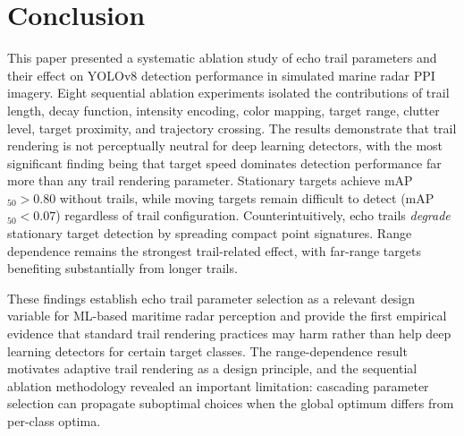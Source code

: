 \documentclass[colorlinks,upint,balance]{asmeconf}
\begin{document}
\section{Conclusion}

This paper presented a systematic ablation study of echo trail parameters and their effect on YOLOv8 detection performance in simulated marine radar PPI imagery. Eight sequential ablation experiments isolated the contributions of trail length, decay function, intensity encoding, color mapping, target range, clutter level, target proximity, and trajectory crossing. The results demonstrate that trail rendering is not perceptually neutral for deep learning detectors, with the most significant finding being that target speed dominates detection performance far more than any trail rendering parameter. Stationary targets achieve mAP$_{50} > 0.80$ without trails, while moving targets remain difficult to detect (mAP$_{50} < 0.07$) regardless of trail configuration. Counterintuitively, echo trails \textit{degrade} stationary target detection by spreading compact point signatures. Range dependence remains the strongest trail-related effect, with far-range targets benefiting substantially from longer trails.

These findings establish echo trail parameter selection as a relevant design variable for ML-based maritime radar perception and provide the first empirical evidence that standard trail rendering practices may harm rather than help deep learning detectors for certain target classes. The range-dependence result motivates adaptive trail rendering as a design principle, and the sequential ablation methodology revealed an important limitation: cascading parameter selection can propagate suboptimal choices when the global optimum differs from per-class optima.
\end{document}
